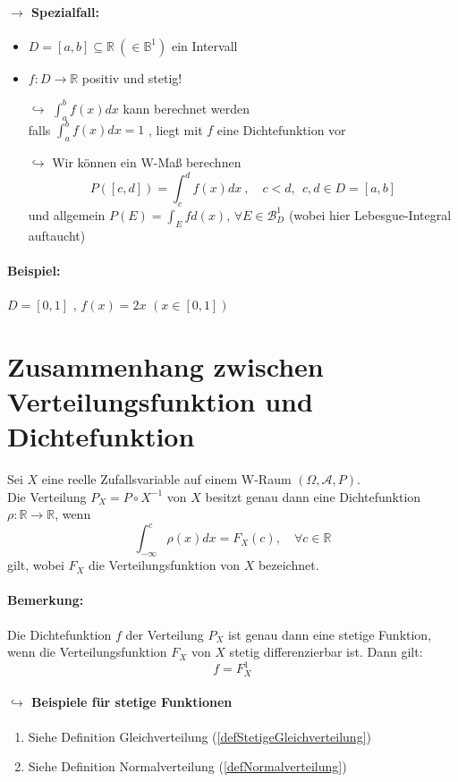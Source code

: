 \documentclass[12pt,a4paper]{article}
\begin{document}
	\paragraph{$\rightarrow$ Spezialfall:}
	\begin{itemize}
		\item $\displaystyle D=[a,b]\subseteq\mathbb{R} \: (\in\mathbb{B}^1)$ ein Intervall
		\item $f:D\rightarrow\mathbb{R}$ positiv und stetig!
		\item[$\hookrightarrow$] $\displaystyle \int^b_a f(x)dx$ kann berechnet werden\\
		falls $\displaystyle \int_a^b f(x)dx=1$ , liegt mit $f$ eine Dichtefunktion vor
		\item[$\hookrightarrow$] Wir können ein W-Maß berechnen
		$$P([c,d])=\int_c^d f(x)dx \: , \quad c<d ,\:\: c,d\in D=[a,b]$$
		und allgemein $\displaystyle P(E)=\int_E fd(x)$, $\forall E\in\mathcal{B}^1_D$ (wobei hier Lebesgue-Integral auftaucht) 
	\end{itemize}

	\paragraph{Beispiel:}
	$D=[0,1]$ , $f(x)=2x$ \quad $(x\in[0,1])$
	
	\section*{Zusammenhang zwischen Verteilungsfunktion und Dichtefunktion}
	Sei $X$ eine reelle Zufallsvariable auf einem W-Raum $(\Omega, \mathcal{A}, P)$.\\
	Die Verteilung $P_X =P\circ X^{-1}$ von $X$ besitzt genau dann eine Dichtefunktion $\rho: \mathbb{R}\rightarrow\mathbb{R}$, wenn 
	$$\int_{-\infty}^c \rho (x)dx = F_X(c), \quad \forall c\in\mathbb{R}$$
	gilt, wobei $F_X$ die Verteilungsfunktion von $X$ bezeichnet.	
	
	\paragraph{Bemerkung:}
	Die Dichtefunktion $f$ der Verteilung $P_X$ ist genau dann eine stetige Funktion, wenn die Verteilungsfunktion $F_X$ von $X$ stetig differenzierbar ist. Dann gilt:
	$$f=F^1_X$$
	
	\paragraph{$\hookrightarrow$ Beispiele für stetige Funktionen}
	\begin{enumerate}
		\item Siehe Definition Gleichverteilung (\ref{defStetigeGleichverteilung})
		\item Siehe Definition Normalverteilung (\ref{defNormalverteilung})
	\end{enumerate}		
	
	
	
\end{document}
